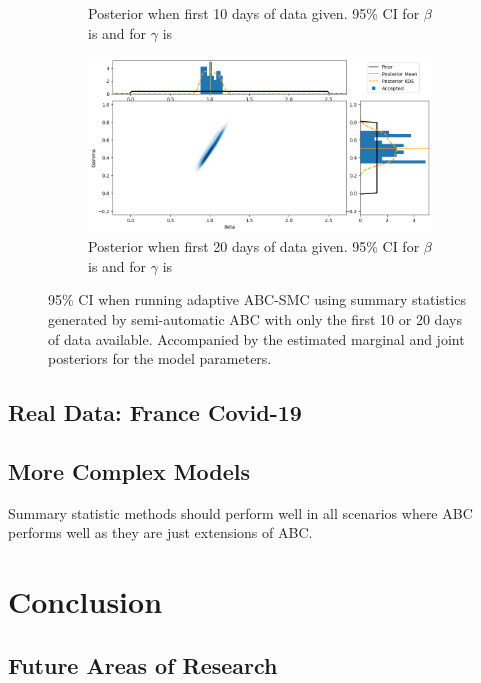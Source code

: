 \documentclass[11pt,a4paper]{article}
\theoremstyle{break}
\begin{document}
\begin{figure}[H]
{\begin{subfigure}{.45\paperwidth}
        \caption{Posterior when first 10 days of data given. 95\% CI for $\beta$ is \text{[0.842,1.160]} and for $\gamma$ is \text{[0.305,0.705]}}
        \label{fig_semi_auto_10_days_posterior}
      \end{subfigure}
      \begin{subfigure}{.45\paperwidth}
        \centering
        \includegraphics[width=1\textwidth]{Semi_Auto_ABC_SMC_20_days_joint_posterior.png}
        \caption{Posterior when first 20 days of data given. 95\% CI for $\beta$ is \text{[0.891,1.164]} and for $\gamma$ is \text{[0.340,0.603]}}
        \label{fig_semi_auto_20_days_posterior}
      \end{subfigure}
    }
    \caption{95\% CI when running adaptive ABC-SMC using summary statistics generated by semi-automatic ABC with only the first 10 or 20 days of data available. Accompanied by the estimated marginal and joint posteriors for the model parameters.}
    \label{fig_semi_auto_restricted_data}
  \end{figure}

\subsection{Real Data: France Covid-19}\label{sec_real_data}


\subsection{More Complex Models}\label{sec_more_complex_models}

  \par Summary statistic methods should perform well in all scenarios where ABC performs well as they are just extensions of ABC.

\newpage
\section{Conclusion}

\subsection{Future Areas of Research}


\newpage
\setcounter{page}{1}


\end{document}
